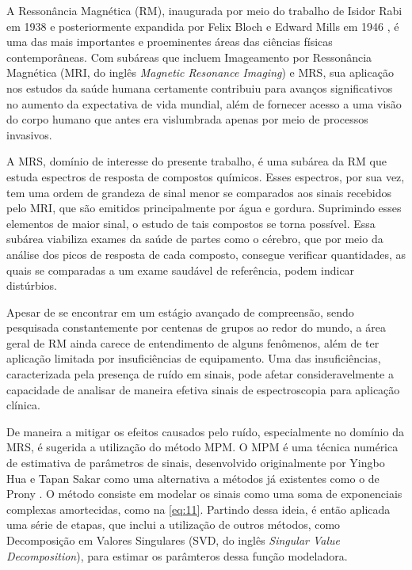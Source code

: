 \documentclass[12pt]{article}
\begin{document}
A Ressonância Magnética (RM), inaugurada por meio do trabalho de Isidor Rabi em 1938 \cite{PhysRev.53.318} e 
posteriormente expandida por Felix Bloch e Edward Mills em 1946 \cite{Filler2009}, é uma das mais importantes e proeminentes áreas das
ciências físicas contemporâneas. Com subáreas que incluem Imageamento por Ressonância Magnética (MRI, do inglês \textit{Magnetic Resonance Imaging}) e 
MRS, sua aplicação nos estudos da saúde humana certamente contribuiu para
avanços significativos no aumento da expectativa de vida mundial, além de fornecer acesso a uma visão do corpo humano que antes
era vislumbrada apenas por meio de processos invasivos.

A MRS, domínio de interesse do presente trabalho, é uma subárea da RM que estuda espectros de resposta de compostos químicos. 
Esses espectros, por sua vez, tem uma ordem de grandeza de sinal menor se comparados aos sinais recebidos pelo MRI, que são emitidos 
principalmente por água e gordura. Suprimindo esses elementos de maior sinal, o estudo de tais compostos se torna possível. 
Essa subárea viabiliza exames da saúde de partes como o cérebro, que por meio da análise dos picos de resposta de cada composto, 
consegue verificar quantidades, as quais se comparadas a um exame saudável de referência, podem indicar distúrbios.

Apesar de se encontrar em um estágio avançado de compreensão, sendo pesquisada constantemente por centenas de grupos ao redor do mundo, a 
área geral de RM ainda carece de entendimento de alguns fenômenos, além de ter aplicação limitada por insuficiências de equipamento. 
Uma das insuficiências, caracterizada pela presença de ruído em sinais, pode afetar consideravelmente a capacidade de 
analisar de maneira efetiva sinais de espectroscopia para aplicação clínica. 

De maneira a mitigar os efeitos causados pelo ruído, especialmente no domínio da MRS, é sugerida a utilização do método MPM. O MPM é uma técnica numérica
de estimativa de parâmetros de sinais, desenvolvido originalmente por Yingbo Hua e Tapan Sakar \cite{370583} como uma alternativa a métodos já existentes 
como o de Prony \cite{49090}. O método consiste em modelar os sinais como uma soma de exponenciais complexas amortecidas, como na \autoref{eq:11}. Partindo 
dessa ideia, é então aplicada uma série de etapas, que inclui a utilização de outros métodos, como Decomposição em Valores Singulares (SVD, do inglês \textit{Singular Value Decomposition}), 
para estimar os parâmteros dessa função modeladora.  
\end{document}
